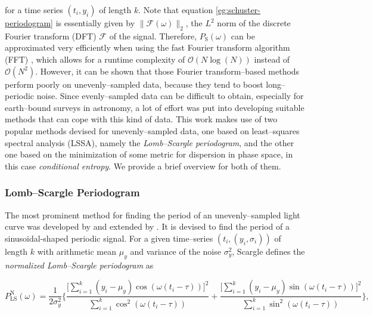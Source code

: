 
for a time series $(t_i, y_i)$ of length $k$. Note that equation \eqref{eg:schuster-periodogram} is essentially given by $\| \mathcal{F}(\omega) \|_2 $, the $L^2$ norm of the discrete Fourier transform (DFT) $\mathcal{F}$ of the signal. Therefore, $P_{\text{S}}(\omega)$ can be approximated very efficiently when using the fast Fourier transform algorithm (FFT) \citep{cooley1965}, which allows for a runtime complexity of $\mathcal{O}(N\log{(N)})$ instead of $\mathcal{O}(N^2)$. However, it can be shown that those Fourier transform--based methods perform poorly on unevenly--sampled data, because they tend to boost long--periodic noise. Since evenly--sampled data can be difficult to obtain, especially for earth--bound surveys in astronomy, a lot of effort was put into developing suitable methods that can cope with this kind of data. This work makes use of two popular methods devised for unevenly--sampled data, one based on least--squares spectral analysis (LSSA), namely the \emph{Lomb--Scargle periodogram}, and the other one based on the minimization of some metric for dispersion in phase space, in this case \emph{conditional entropy}. We provide a brief overview for both of them.

\subsubsection{Lomb--Scargle Periodogram}
\label{subsubsec:lomb-scargle}

The most prominent method for finding the period of an unevenly--sampled light curve was developed by \citet{lomb1976} and extended by \citet{scargle1982}. It is devised to find the period of a sinusoidal-shaped periodic signal. For a given time--series $(t_i, (y_i, \sigma_i))$ of length $k$ with arithmetic mean $\mu_y$ and variance of the noise $\sigma_y^2$, Scargle defines the \emph{normalized Lomb--Scargle periodogram} as

\begin{equation}
\label{eq:normalized-lomb-scargle}
P^{\text{N}}_{\text{LS}}(\omega) = \frac{1}{2 \sigma_y^2} \Bigg\{ \frac{\big[\sum\limits_{i=1}^k (y_i - \mu_y) \cos(\omega(t_i - \tau))\big]^2}{\sum\limits_{i=1}^k \cos^2(\omega(t_i - \tau))} + \frac{\big[\sum\limits_{i=1}^k (y_i - \mu_y) \sin(\omega(t_i - \tau))\big]^2}{\sum\limits_{i=1}^k \sin^2(\omega(t_i - \tau))}\Bigg\},
\end{equation}

